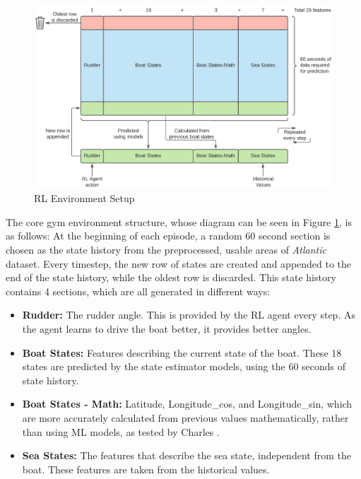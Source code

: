 \documentclass[12pt,twoside]{report}
\begin{document}
\begin{figure}[htbp]
\includegraphics[width=1.1\textwidth,center]{figures/rl-env/JTR env setup.png}
\caption{RL Environment Setup}
\label{fig:env-setup}
\end{figure}

The core gym environment structure, whose diagram can be seen in Figure \ref{fig:env-setup}, is as follows: At the beginning of each episode, a random 60 second section is chosen as the state history from the preprocessed, usable areas of \textit{Atlantic} dataset. Every timestep, the new row of states are created and appended to the end of the state history, while the oldest row is discarded. This state history contains 4 sections, which are all generated in different ways:

\begin{itemize}
    \item \textbf{Rudder:} The rudder angle. This is provided by the RL agent every step. As the agent learns to drive the boat better, it provides better angles.
    \item \textbf{Boat States:} Features describing the current state of the boat. These 18 states are predicted by the state estimator models, using the 60 seconds of state history.
    \item \textbf{Boat States - Math:} Latitude, Longitude\_cos, and Longitude\_sin, which are more accurately calculated from previous values mathematically, rather than using ML models, as tested by Charles \cite{charles}.
    \item \textbf{Sea States:} The features that describe the sea state, independent from the boat. These features are taken from the historical values.
\end{itemize}
\end{document}
